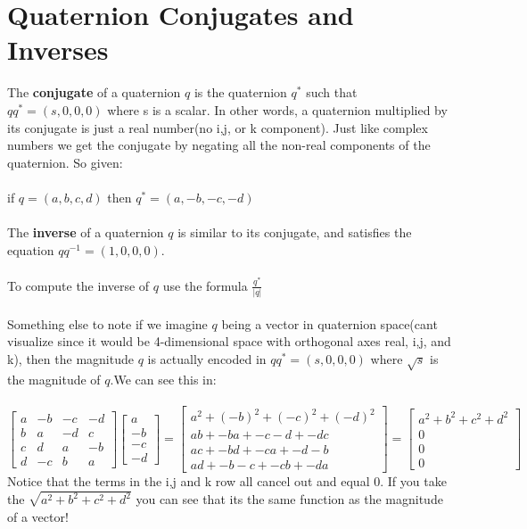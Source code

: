 \documentclass{article}
\begin{document}
\section{Quaternion Conjugates and Inverses}
The \textbf{conjugate} of a quaternion $q$ is the quaternion $q^*$ such that $qq^*=(s,0,0,0)$ where s is a scalar. In other words, a quaternion multiplied by its conjugate is just a real number(no i,j, or k component). Just like complex numbers we get the conjugate by negating all the non-real components of the quaternion. So given:\\\\
if $q=(a,b,c,d)$ then $q^*=(a,-b,-c,-d)$\\\\
The \textbf{inverse} of a quaternion $q$ is similar to its conjugate, and satisfies the equation $qq^{-1}=(1,0,0,0)$.\\\\
To compute the inverse of $q$ use the formula $\frac{q^*}{|q|}$\\\\
Something else to note if we imagine $q$ being a vector in quaternion space(cant visualize since it would be 4-dimensional space with orthogonal axes real, i,j, and k), then the magnitude $q$ is actually encoded in $qq^*=(s,0,0,0)$ where $\sqrt{s}$ is the magnitude of $q$.We can see this in:\\\\
$\begin{bmatrix}
a & -b & -c & -d\\
b & a & -d & c\\
c & d & a & -b\\
d & -c & b & a
\end{bmatrix}\begin{bmatrix}
a\\
-b\\
-c\\
-d
\end{bmatrix}=\begin{bmatrix}
a^2 + (-b)^2 + (-c)^2 + (-d)^2\\
ab + -ba + -c-d + -dc\\
ac + -bd + -ca + -d-b \\
ad + -b-c + -cb + -da 
\end{bmatrix}=\begin{bmatrix}
a^2 + b^2 + c^2 + d^2\\
0\\
0\\
0
\end{bmatrix}$ Notice that the terms in the i,j and k row all cancel out and equal 0. If you take the $\sqrt{a^2+b^2+c^2+d^2}$ you can see that its the same function as the magnitude of a vector! \\\\
\end{document}
